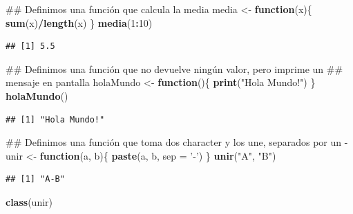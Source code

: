 \documentclass[spanish,]{book}
\newenvironment{Shaded}{\begin{snugshade}}{\end{snugshade}}
\newcommand{\KeywordTok}[1]{\textcolor[rgb]{0.13,0.29,0.53}{\textbf{#1}}}
\newcommand{\DataTypeTok}[1]{\textcolor[rgb]{0.13,0.29,0.53}{#1}}
\newcommand{\DecValTok}[1]{\textcolor[rgb]{0.00,0.00,0.81}{#1}}
\newcommand{\StringTok}[1]{\textcolor[rgb]{0.31,0.60,0.02}{#1}}
\newcommand{\ControlFlowTok}[1]{\textcolor[rgb]{0.13,0.29,0.53}{\textbf{#1}}}
\newcommand{\OperatorTok}[1]{\textcolor[rgb]{0.81,0.36,0.00}{\textbf{#1}}}
\newcommand{\NormalTok}[1]{#1}
\begin{document}
\begin{Shaded}
\begin{Highlighting}[]
\NormalTok{## Definimos una función que calcula la media}
\NormalTok{media <-}\StringTok{ }\ControlFlowTok{function}\NormalTok{(x)\{}
  \KeywordTok{sum}\NormalTok{(x)}\OperatorTok{/}\KeywordTok{length}\NormalTok{(x)}
\NormalTok{\}}
\KeywordTok{media}\NormalTok{(}\DecValTok{1}\OperatorTok{:}\DecValTok{10}\NormalTok{)}
\end{Highlighting}
\end{Shaded}

\begin{verbatim}
## [1] 5.5
\end{verbatim}

\begin{Shaded}
\begin{Highlighting}[]
\NormalTok{## Definimos una función que no devuelve ningún valor, pero imprime un}
\NormalTok{## mensaje en pantalla}
\NormalTok{holaMundo <-}\StringTok{ }\ControlFlowTok{function}\NormalTok{()\{}
  \KeywordTok{print}\NormalTok{(}\StringTok{"Hola Mundo!"}\NormalTok{)}
\NormalTok{\}}
\KeywordTok{holaMundo}\NormalTok{()}
\end{Highlighting}
\end{Shaded}

\begin{verbatim}
## [1] "Hola Mundo!"
\end{verbatim}

\begin{Shaded}
\begin{Highlighting}[]
\NormalTok{## Definimos una función que toma dos character y los une, separados por un -}
\NormalTok{unir <-}\StringTok{ }\ControlFlowTok{function}\NormalTok{(a, b)\{}
  \KeywordTok{paste}\NormalTok{(a, b, }\DataTypeTok{sep =} \StringTok{'-'}\NormalTok{)}
\NormalTok{\}}
\KeywordTok{unir}\NormalTok{(}\StringTok{"A"}\NormalTok{, }\StringTok{"B"}\NormalTok{)}
\end{Highlighting}
\end{Shaded}

\begin{verbatim}
## [1] "A-B"
\end{verbatim}

\begin{Shaded}
\begin{Highlighting}[]
\KeywordTok{class}\NormalTok{(unir)}
\end{Highlighting}
\end{Shaded}
\end{document}
